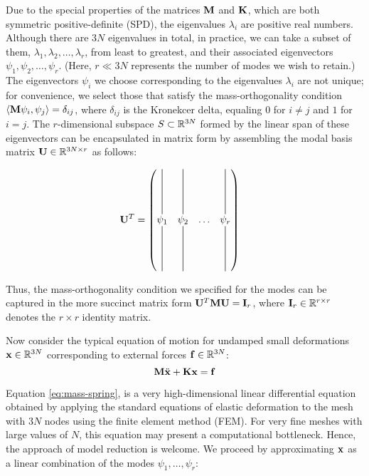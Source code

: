 Due to the special properties of the matrices $\mathbf{M}$ and $\mathbf{K}$, which are both symmetric positive-definite (SPD), the eigenvalues $\lambda_i$ are positive real numbers. 
Although there are $3N$ eigenvalues in total, in practice, we can take a subset of them, $\lambda_1, \lambda_2, \dots, \lambda_r$, from least to greatest, and their associated eigenvectors
 $\psi_1, \psi_2, \dots, \psi_r$. (Here, $r \ll 3N$ represents the number of modes we wish to retain.) The eigenvectors $\psi_i$ we choose corresponding to the eigenvalues $\lambda_i$ 
 are not unique; for convenience, we select those that satisfy the mass-orthogonality condition $\langle \mathbf{M} \psi_i, \psi_j \rangle = \delta_{ij}$, where $\delta_{ij}$ is the Kronekcer delta, 
 equaling $0$ for $i \neq j$ and $1$ for $i=j$. The $r$-dimensional subspace $S \subset \mathbb{R}^{3N}$ formed by the linear span of these eigenvectors can be encapsulated in matrix form 
 by assembling the modal basis matrix $\mathbf{U} \in \mathbb{R}^{3N \times r}$ as follows:

\begin{align}
	\UU^{T} &= \begin{pmatrix}
	\vertbar & \vertbar &   & \vertbar \\
	\psi_1 & \psi_2 & \dots & \psi_r   \\
	\vertbar & \vertbar &   & \vertbar
  \end{pmatrix}
\end{align}

Thus, the mass-orthogonality condition we specified for the modes can be captured in the more succinct matrix form $\mathbf{U}^{T} \mathbf{M} \mathbf{U} = \mathbf{I}_r$,
where $\mathbf{I}_r \in \mathbb{R}^{r \times r}$ denotes the $r \times r$ identity matrix.

Now consider the typical equation of motion for undamped small deformations $\mathbf{x} \in \mathbb{R}^{3N}$ corresponding to external forces $\mathbf{f} \in \mathbb{R}^{3N}$: 
\begin{equation}
\label{eq:mass-spring}
\mathbf{M} \ddot{\mathbf{x}} + \mathbf{K} \mathbf{x} = \mathbf{f}
\end{equation}

Equation \ref{eq:mass-spring}, is a very high-dimensional linear differential equation obtained by applying the standard equations of elastic deformation to the mesh with $3N$ nodes using the finite element method (FEM). For very fine meshes with large values of $N$, this equation may present a computational bottleneck. Hence, the approach of model reduction is welcome. We proceed by approximating $\mathbf{x}$ as a linear combination of the modes $\psi_1, \dots, \psi_r$:

